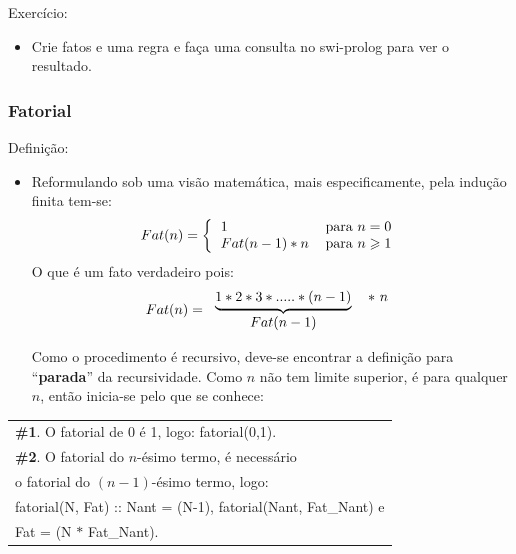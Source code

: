 \documentclass[sans]{beamer}
\begin{document}
\begin{frame}[fragile]   %
\begin{block}{Exercício:}
\begin{itemize}

\item Crie fatos e uma regra e faça uma consulta no swi-prolog para ver o resultado.

\end{itemize}
\end{block}   
\end{frame}


\begin{frame}
\frametitle{Fatorial}
\begin{block}{Definição:}
\begin{itemize}
\item Reformulando sob uma visão
matemática, mais especificamente, pela indução finita tem-se:
\[
Fat(n)=\left\{
\begin{tabular}[c]{ll}%
$1$ & para $n=0$\\
$Fat(n-1)\ast n$ & para $n\geqslant1$%
\end{tabular}
\right.
\]
\vskip 11pt
O que \'{e} um fato verdadeiro pois:
\vskip 11pt
\[
Fat(n)=
\begin{tabular}
[c]{cc}%
$\underbrace{1\ast2\ast3\ast.....\ast(n-1)}$ & $\ast \ n$\\
$Fat(n-1)$ &
\end{tabular}
\]

Como o procedimento é recursivo, deve-se encontrar a definição para
``\textbf{parada}'' da recursividade. Como $n$ não tem limite superior, é para qualquer $n$, então inicia-se pelo que se conhece:

\end{itemize}
\end{block}
\end{frame}


\begin{frame}
\begin{block}{}
\begin{center}%
\begin{tabular}
[c]{|l|}\hline
\textbf{\#1}. O fatorial de 0 \'{e} 1, logo: fatorial(0,1).\\
\textbf{\#2}. O fatorial  do $n$-\'{e}simo termo, \'{e} necess\'{a}rio \\
o fatorial do $(n-1)$-\'{e}simo termo, logo:\\
fatorial(N, Fat) ::  Nant = (N-1), fatorial(Nant, Fat\_Nant) e \\
 Fat = (N $\ast$ Fat\_Nant).\\ \hline
\end{tabular}
\end{center}
\end{block}
\end{frame}
\end{document}
